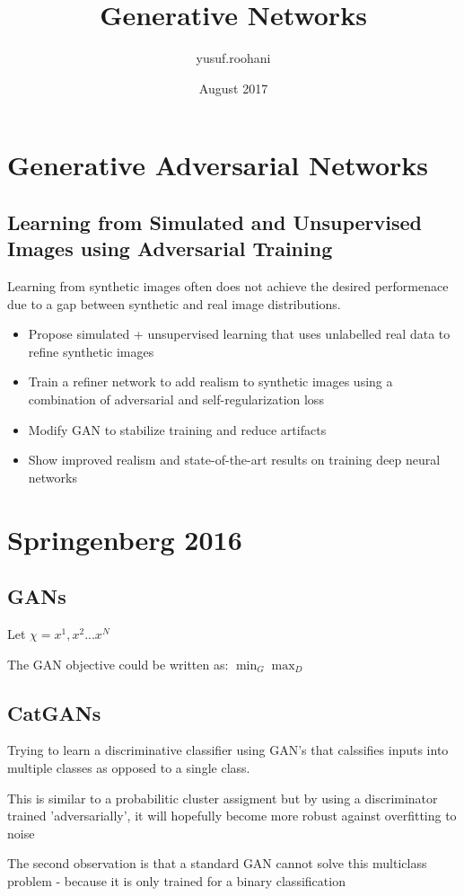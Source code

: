\documentclass{article}
\title{Generative Networks}
\author{yusuf.roohani }
\date{August 2017}
\begin{document}
\maketitle

\section{Generative Adversarial Networks}

\subsection{Learning from Simulated and Unsupervised Images using Adversarial Training \cite{shrivastava2016learning}} 

Learning from synthetic images often does not achieve the desired performenace due to a gap between synthetic and real image distributions. 

\begin{itemize}

    \item Propose simulated + unsupervised learning that uses unlabelled real data to refine synthetic images
    \item Train a refiner network to add realism to synthetic images using a combination of adversarial and self-regularization loss
    \item Modify GAN to stabilize training and reduce artifacts
    \item Show improved realism and state-of-the-art results on training deep neural networks

\end{itemize}

\section{Springenberg 2016}

\subsection{GANs}

Let $\chi = {x^1, x^2 ... x^N}$

The GAN objective could be written as:
$ \min_{G} \max_D $

\subsection{CatGANs}

Trying to learn a discriminative classifier using GAN's that calssifies inputs into multiple classes as opposed to a single class.

This is similar to a probabilitic cluster assigment but by using a discriminator trained 'adversarially', it will hopefully become more robust against overfitting to noise

The second observation is that a standard GAN cannot solve this multiclass problem - because it is only trained for a binary classification





\end{document}
